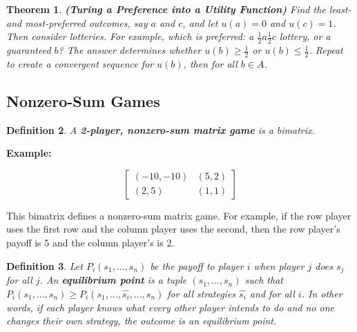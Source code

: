 \documentclass{article}
\theoremstyle{colontheorem}
\newtheorem{theorem}{Theorem}[section]
\newtheorem{definition}[theorem]{Definition}
\newenvironment{Theorem}
{
	\begin{mdframed}[backgroundcolor=TheoremOrange!10]
	\begin{theorem}
}
{
	\end{theorem}
	\end{mdframed}
	
	\vspace{.15in}
}
\newenvironment{Def}
{
	\begin{mdframed}[backgroundcolor=DefGreen!10]
	\begin{definition}
}
{
	\end{definition}
	\end{mdframed}
	
	\vspace{.15in}
}
\newenvironment{Example}
{
	\begin{mdframed}
	\textbf{Example:}%
}
{
	\end{mdframed}
	
	\vspace{.15in}
}
\begin{document}
\begin{Theorem}
	
	\textbf{(Turing a Preference into a Utility Function)} Find the least- and most-preferred outcomes, say $a$ and $c$, and let $u(a) = 0$ and $u(c) = 1$. Then consider lotteries. For example, which is preferred: a $\frac{1}{2} a \frac{1}{2} c$ lottery, or a guaranteed $b$? The answer determines whether $u(b) \geq \frac{1}{2}$ or $u(b) \leq \frac{1}{2}$. Repeat to create a convergent sequence for $u(b)$, then for all $b \in A$.
	
\end{Theorem}





\begin{center}
	\pagebreak
	
	\section{Nonzero-Sum Games}
	
	\vspace{.1in}
\end{center}



\begin{Def}
	
	A \textbf{2-player, nonzero-sum matrix game} is a bimatrix.
	
\end{Def}



\begin{Example}
	$$
		\begin{bmatrix}
			(-10, -10) & (5, 2)\\
			(2, 5) & (1, 1)
		\end{bmatrix}
	$$
	
	This bimatrix defines a nonzero-sum matrix game. For example, if the row player uses the first row and the column player uses the second, then the row player's payoff is $5$ and the column player's is $2$.
	
\end{Example}



\begin{Def}
	
	Let $P_i(s_1, ..., s_n)$ be the payoff to player $i$ when player $j$ does $s_j$ for all $j$. An \textbf{equilibrium point} is a tuple $(s_1, ..., s_n)$ such that $P_i(s_1, ..., s_n) \geq P_i(s_1, ..., \hat{s_i}, ..., s_n)$ for all strategies $\hat{s_i}$ and for all $i$. In other words, if each player knows what every other player intends to do and no one changes their own strategy, the outcome is an equilibrium point.
	
\end{Def}
\end{document}
